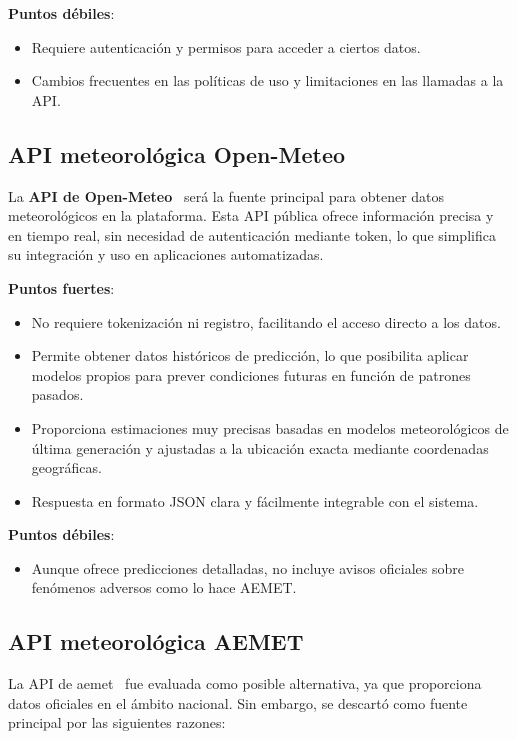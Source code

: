 \textbf{Puntos débiles}:
\begin{itemize}
    \item Requiere autenticación y permisos para acceder a ciertos datos.
    \item Cambios frecuentes en las políticas de uso y limitaciones en las llamadas a la API.
\end{itemize}



\subsection{API meteorológica Open-Meteo}
La \textbf{\gls{API} de Open-Meteo}~\cite{open-meteo-api} será la fuente principal para obtener datos meteorológicos en la plataforma. Esta \gls{API} pública ofrece información precisa y en tiempo real, sin necesidad de autenticación mediante token, lo que simplifica su integración y uso en aplicaciones automatizadas.

\textbf{Puntos fuertes}:
\begin{itemize}
    \item No requiere tokenización ni registro, facilitando el acceso directo a los datos.
    \item Permite obtener datos históricos de predicción, lo que posibilita aplicar modelos propios para prever condiciones futuras en función de patrones pasados.
    \item Proporciona estimaciones muy precisas basadas en modelos meteorológicos de última generación y ajustadas a la ubicación exacta mediante coordenadas geográficas.
    \item Respuesta en formato JSON clara y fácilmente integrable con el sistema.
\end{itemize}

\textbf{Puntos débiles}:
\begin{itemize}
    \item Aunque ofrece predicciones detalladas, no incluye avisos oficiales sobre fenómenos adversos como lo hace AEMET.
\end{itemize}


\subsection{API meteorológica AEMET}
La \gls{API} de \gls{aemet}~\cite{aemet-api} fue evaluada como posible alternativa, ya que proporciona datos oficiales en el ámbito nacional. Sin embargo, se descartó como fuente principal por las siguientes razones:

